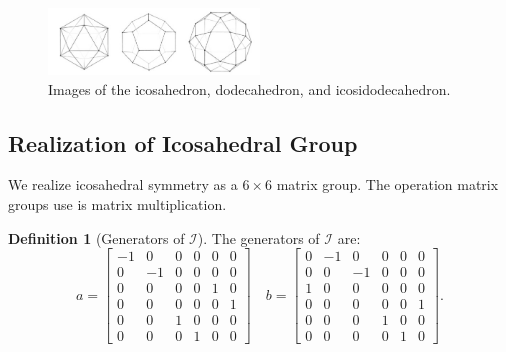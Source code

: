 \documentclass[a4paper,10pt]{article}
\theoremstyle{plain}
\theoremstyle{definition}
\newtheorem{Definition}[Theorem]{Definition}
\theoremstyle{remark}
\begin{document}
\begin{figure}[h]
	\centering
	\captionsetup{width=0.5\textwidth}
	\includegraphics[width=0.5\textwidth]{images/ICO_DOD_IDD.jpg}
	\caption{Images of the icosahedron, dodecahedron, and icosidodecahedron.}
\end{figure}

\subsection{Realization of Icosahedral Group}
We realize icosahedral symmetry as a \( 6 \times 6 \) matrix group.
The operation matrix groups use is matrix multiplication.
\begin{Definition}[Generators of \(\mathcal{I}\)]
    The generators of \(\mathcal{I}\) are:
    \[a = \begin{bmatrix}
    -1 & 0  & 0 & 0 & 0 & 0 \\
    0  & -1 & 0 & 0 & 0 & 0 \\
    0  & 0  & 0 & 0 & 1 & 0 \\
    0  & 0  & 0 & 0 & 0 & 1 \\
    0  & 0  & 1 & 0 & 0 & 0 \\
    0  & 0  & 0 & 1 & 0 & 0
\end{bmatrix} \quad b = \begin{bmatrix}
    0 & -1 & 0  & 0 & 0 & 0 \\
    0 & 0  & -1 & 0 & 0 & 0 \\
    1 & 0  & 0  & 0 & 0 & 0 \\
    0 & 0  & 0  & 0 & 0 & 1 \\
    0 & 0  & 0  & 1 & 0 & 0 \\
    0 & 0  & 0  & 0 & 1 & 0
\end{bmatrix}.\]
\end{Definition}
\end{document}
